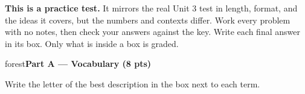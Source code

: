 \documentclass[10pt]{article}
\newcommand{\parthead}[1]{%
  \vspace{6pt}\noindent
  \begin{headlinebox}{forest}\color{white}\bfseries #1\end{headlinebox}%
  \vspace{4pt}}
\begin{document}

\vspace{0.10in}
\begin{remindbox}
\small
\textbf{This is a practice test.} It mirrors the real Unit 3 test in length, format,
and the ideas it covers, but the numbers and contexts differ. Work every problem
with no notes, then check your answers against the key. Write each final answer in its box. Only what is inside a box is graded.
\end{remindbox}

\parthead{Part A --- Vocabulary (8 pts)}
Write the letter of the best description in the box next to each term.
\end{document}
